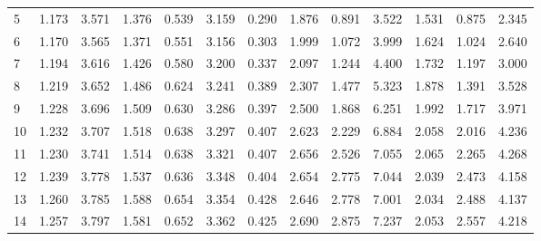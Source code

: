 \begin{tabular}{lrrrrrrrrrrrr}
	5                   & 1.173                          & 3.571                        & 1.376                        & 0.539                      & 3.159 & 0.290     & 1.876         & 0.891 & 3.522     & 1.531         & 0.875 & 2.345     \\
	6                   & 1.170                          & 3.565                        & 1.371                        & 0.551                      & 3.156 & 0.303     & 1.999         & 1.072 & 3.999     & 1.624         & 1.024 & 2.640     \\
	7                   & 1.194                          & 3.616                        & 1.426                        & 0.580                      & 3.200 & 0.337     & 2.097         & 1.244 & 4.400     & 1.732         & 1.197 & 3.000     \\
	8                   & 1.219                          & 3.652                        & 1.486                        & 0.624                      & 3.241 & 0.389     & 2.307         & 1.477 & 5.323     & 1.878         & 1.391 & 3.528     \\
	9                   & 1.228                          & 3.696                        & 1.509                        & 0.630                      & 3.286 & 0.397     & 2.500         & 1.868 & 6.251     & 1.992         & 1.717 & 3.971     \\
	10                  & 1.232                          & 3.707                        & 1.518                        & 0.638                      & 3.297 & 0.407     & 2.623         & 2.229 & 6.884     & 2.058         & 2.016 & 4.236     \\
	11                  & 1.230                          & 3.741                        & 1.514                        & 0.638                      & 3.321 & 0.407     & 2.656         & 2.526 & 7.055     & 2.065         & 2.265 & 4.268     \\
	12                  & 1.239                          & 3.778                        & 1.537                        & 0.636                      & 3.348 & 0.404     & 2.654         & 2.775 & 7.044     & 2.039         & 2.473 & 4.158     \\
	13                  & 1.260                          & 3.785                        & 1.588                        & 0.654                      & 3.354 & 0.428     & 2.646         & 2.778 & 7.001     & 2.034         & 2.488 & 4.137     \\
	14                  & 1.257                          & 3.797                        & 1.581                        & 0.652                      & 3.362 & 0.425     & 2.690         & 2.875 & 7.237     & 2.053         & 2.557 & 4.218     \\

\end{tabular}

